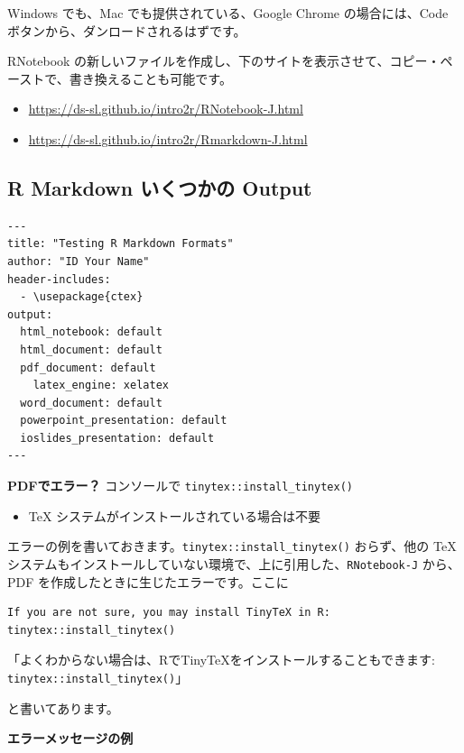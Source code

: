 \documentclass[
]{bxjsbook}
\providecommand{\tightlist}{%
  \setlength{\itemsep}{0pt}\setlength{\parskip}{0pt}}
\theoremstyle{definition}
\theoremstyle{definition}
\theoremstyle{definition}
\theoremstyle{definition}
\theoremstyle{remark}
\begin{document}
Windows でも、Mac でも提供されている、Google Chrome の場合には、Code ボタンから、ダンロードされるはずです。

RNotebook の新しいファイルを作成し、下のサイトを表示させて、コピー・ペーストで、書き換えることも可能です。

\begin{itemize}
\tightlist
\item
  \url{https://ds-sl.github.io/intro2r/RNotebook-J.html}
\item
  \url{https://ds-sl.github.io/intro2r/Rmarkdown-J.html}
\end{itemize}

\hypertarget{r-markdown-ux3044ux304fux3064ux304bux306e-output}{%
\subsection{R Markdown いくつかの Output}\label{r-markdown-ux3044ux304fux3064ux304bux306e-output}}

\begin{verbatim}
---
title: "Testing R Markdown Formats"
author: "ID Your Name"
header-includes:
  - \usepackage{ctex}
output:
  html_notebook: default
  html_document: default
  pdf_document: default
    latex_engine: xelatex
  word_document: default
  powerpoint_presentation: default
  ioslides_presentation: default
---
\end{verbatim}

\textbf{PDFでエラー？} コンソールで \texttt{tinytex::install\_tinytex()}

\begin{itemize}
\tightlist
\item
  TeX システムがインストールされている場合は不要
\end{itemize}

エラーの例を書いておきます。\texttt{tinytex::install\_tinytex()} おらず、他の TeX システムもインストールしていない環境で、上に引用した、\texttt{RNotebook-J} から、PDF を作成したときに生じたエラーです。ここに

\begin{verbatim}
If you are not sure, you may install TinyTeX in R: tinytex::install_tinytex()
\end{verbatim}

「よくわからない場合は、RでTinyTeXをインストールすることもできます: \texttt{tinytex::install\_tinytex()}」

と書いてあります。

\textbf{エラーメッセージの例}
\end{document}
